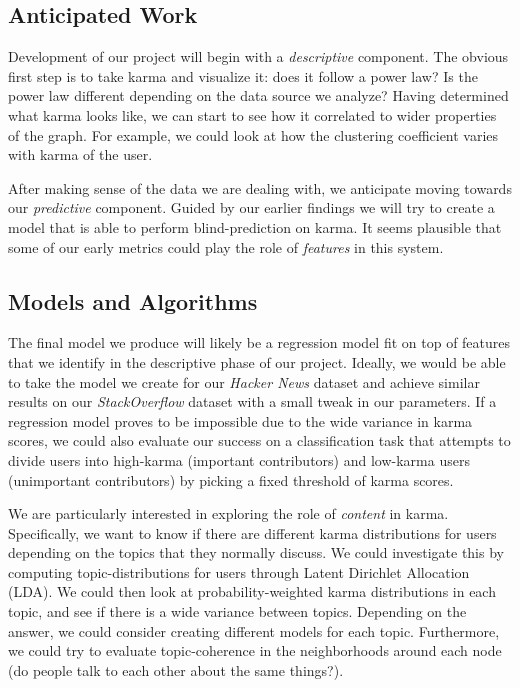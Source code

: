 \documentclass[10pt]{article}
\begin{document}
\subsection{Anticipated Work}
Development of our project will begin with a \textit{descriptive} component. The
obvious first step is to take karma and visualize it: does it follow a power
law?  Is the power law different depending on the data source we analyze? Having
determined what karma looks like, we can start to see how it correlated to wider
properties of the graph. For example, we could look at how the clustering
coefficient varies with karma of the user.

After making sense of the data we are dealing with, we anticipate moving towards
our \textit{predictive} component. Guided by our earlier findings we will try to
create a model that is able to perform blind-prediction on karma. It seems
plausible that some of our early metrics could play the role of
\textit{features} in this system.

\subsection{Models and Algorithms}
\label{sec:models}
The final model we produce will likely be a regression model fit on top of
features that we identify in the descriptive phase of our project. Ideally, we
would be able to take the model we create for our \textit{Hacker News} dataset
and achieve similar results on our \textit{StackOverflow} dataset with a small tweak
in our parameters. If a regression model proves to be impossible due to the wide
variance in karma scores, we could also evaluate our success on a classification
task that attempts to divide users into high-karma (important contributors) and
low-karma users (unimportant contributors) by picking a fixed threshold of karma
scores.

We are particularly interested in exploring the role of \textit{content} in
karma. Specifically, we want to know if there are different karma distributions
for users depending on the topics that they normally discuss. We could
investigate this by computing topic-distributions for users through Latent
Dirichlet Allocation (LDA). We could then look at probability-weighted karma
distributions in each topic, and see if there is a wide variance between topics.
Depending on the answer, we could consider creating different models for each
topic. Furthermore, we could try to evaluate topic-coherence in the
neighborhoods around each node (do people talk to each other about the same
things?).
\end{document}
